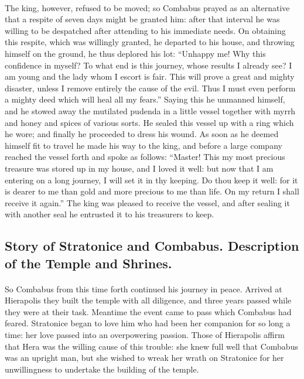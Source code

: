 \documentclass[a4paper, 11pt, oneside, polutonikogreek, english]{article}
\begin{document}
\paragraph{}
The king, however, refused to be moved; so Combabus prayed as an alternative that a respite of seven days might be granted him: after that interval he was willing to be despatched after attending to his immediate needs. On obtaining this respite, which was willingly granted, he departed to his house, and throwing himself on the ground, he thus deplored his lot: ``Unhappy me! Why this confidence in myself? To what end is this journey, whose results I already see? I am young and the lady whom I escort is fair. This will prove a great and mighty disaster, unless I remove entirely the cause of the evil. Thus I must even perform a mighty deed which will heal all my fears.'' Saying this he unmanned himself, and he stowed away the mutilated pudenda in a little vessel together with myrrh and honey and spices of various sorts. He sealed this vessel up with a ring which he wore; and finally he proceeded to dress his wound. As soon as he deemed himself fit to travel he made his way to the king, and before a large company reached the vessel forth and spoke as follows: ``Master! This my most precious treasure was stored up in my house, and I loved it well: but now that I am entering on a long journey, I will set it in thy keeping. Do thou keep it well: for it is dearer to me than gold and more precious to me than life. On my return I shall receive it again.'' The king was pleased to receive the vessel, and after sealing it with another seal he entrusted it to his treasurers to keep.

\subsection{Story of Stratonice and Combabus. Description of the Temple and Shrines.}
\paragraph{}
So Combabus from this time forth continued his journey in peace. Arrived at Hierapolis they built the temple with all diligence, and three years passed while they were at their task. Meantime the event came to pass which Combabus had feared. Stratonice began to love him who had been her companion for so long a time: her love passed into an overpowering passion. Those of Hierapolis affirm that Hera was the willing cause of this trouble: she knew full well that Combabus was an upright man, but she wished to wreak her wrath on Stratonice for her unwillingness to undertake the building of the temple.
\end{document}
